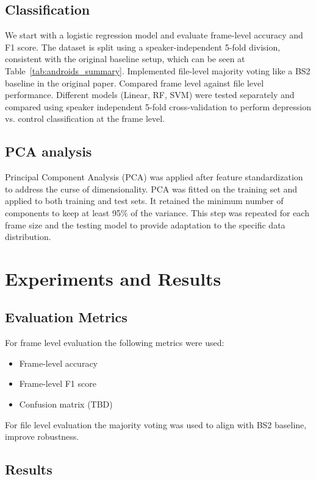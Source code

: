 \documentclass[conference]{IEEEtran}
\begin{document}
\subsection{Classification}
We start with a logistic regression model and evaluate frame-level accuracy and F1 score. 
The dataset is split using a speaker-independent 5-fold division, consistent with the original baseline setup, which can be seen at Table~\ref{tab:androids_summary}.
Implemented file-level majority voting like a BS2 baseline in the original paper.
Compared frame level against file level performance.
Different models (Linear, RF, SVM) were tested separately and compared using speaker independent 5-fold cross-validation 
to perform depression vs. control classification at the frame level.

\subsection{PCA analysis}

Principal Component Analysis (PCA) was applied after feature standardization to address the curse of dimensionality. 
PCA was fitted on the training set and applied to both training and test sets. It retained the minimum number of components to keep at least 95\% of the variance. 
This step was repeated for each frame size and the testing model to provide adaptation to the specific data distribution.

\section{Experiments and Results}

\subsection{Evaluation Metrics}
For frame level evaluation the following metrics were used:
\begin{itemize}
    \item Frame-level accuracy
    \item Frame-level F1 score
    \item Confusion matrix (TBD)
\end{itemize}

For file level evaluation the majority voting was used to align with BS2 baseline, improve robustness.

\subsection{Results}
\end{document}
